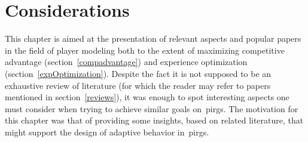 \section{Considerations}

This chapter is aimed at the presentation of relevant aspects and popular papers in the field of player modeling both to the extent of maximizing competitive advantage (section~\ref{compadvantage}) and experience optimization (section~\ref{expOptimization}). Despite the fact it is not supposed to be an exhaustive review of literature (for which the reader may refer to papers mentioned in section~\ref{reviews}), it was enough to spot interesting aspects one must consider when trying to achieve similar goals on~\gls{pirg}s. The motivation for this chapter was that of providing some insights, based on related literature, that might support the design of adaptive behavior in~\gls{pirg}s. 
